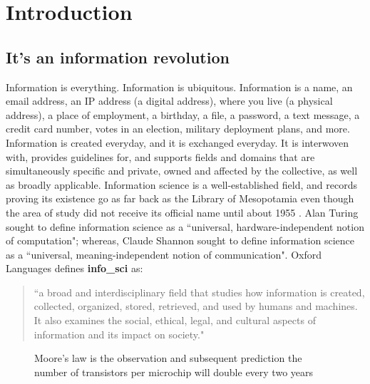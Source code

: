 \graphicspath{{Images/}}

\section{Introduction}
\subsection{It's an information revolution}
Information is everything. Information is ubiquitous. Information is a name, an email address, an IP address (a digital address), where you live (a physical address), a place of employment, a birthday, a file, a password, a text message, a credit card number, votes in an election, military deployment plans, and more. Information is created everyday, and it is exchanged everyday. It is interwoven with, provides guidelines for, and supports fields and domains that are simultaneously specific and private, owned and affected by the collective, as well as broadly applicable. Information science is a well-established field, and records proving its existence go as far back as the Library of Mesopotamia \cite{30s_history_of_info_science} even though the area of study did not receive its official name until about 1955 \cite{wiki_info_science}. Alan Turing sought to define information science as a ``universal, hardware-independent notion of computation"; whereas, Claude Shannon sought to define information science as a ``universal, meaning-independent notion of communication". Oxford Languages defines \textbf{\gls{info_sci}} as:
    \begin{quote}
        ``a broad and interdisciplinary field that studies how information is created, collected, organized, stored, retrieved, and used by humans and machines. It also examines the social, ethical, legal, and cultural aspects of information and its impact on society." \cite{bing_is_def}
    \end{quote}

\begin{figure}[ht] 
    \centering
        {
            \captionsetup{justification=centering}
            \caption{Moore's law is the observation and subsequent prediction the number of transistors per microchip will double every two years}
            \label{fig:moores_law}
        }
\end{figure}


